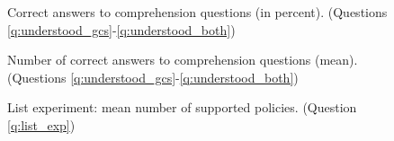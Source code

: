 \documentclass[12pt,english]{article}
\begin{document}
\begin{figure}[h!]
    \caption[Comprehension]{Correct answers to comprehension questions (in percent). (Questions \ref{q:understood_gcs}-\ref{q:understood_both})}\label{fig:understood_each}
\end{figure}

\begin{figure}[h!]
    \caption[Comprehension score]{Number of correct answers to comprehension questions (mean). (Questions \ref{q:understood_gcs}-\ref{q:understood_both})}\label{fig:understood_score}
\end{figure}



\begin{figure}[h!]
    \caption[List experiment]{List experiment: mean number of supported policies. (Question \ref{q:list_exp})}\label{fig:list_exp}
\end{figure}
\end{document}
